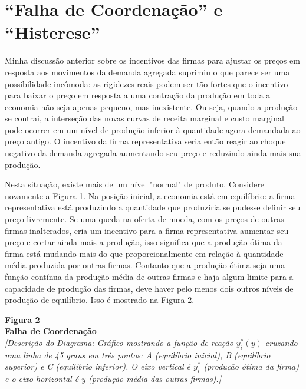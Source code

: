 \documentclass[12pt]{article}
\begin{document}
{\section*{“Falha de Coordenação” e “Histerese”}

Minha discussão anterior sobre os incentivos das firmas para ajustar os preços em resposta aos movimentos da demanda agregada suprimiu o que parece ser uma possibilidade incômoda: as rigidezes reais podem ser tão fortes que o incentivo para baixar o preço em resposta a uma contração da produção em toda a economia não seja apenas pequeno, mas inexistente. Ou seja, quando a produção se contrai, a interseção das novas curvas de receita marginal e custo marginal pode ocorrer em um nível de produção inferior à quantidade agora demandada ao preço antigo. O incentivo da firma representativa seria então reagir ao choque negativo da demanda agregada aumentando seu preço e reduzindo ainda mais sua produção.

Nesta situação, existe mais de um nível "normal" de produto. Considere novamente a Figura 1. Na posição inicial, a economia está em equilíbrio: a firma representativa está produzindo a quantidade que produziria se pudesse definir seu preço livremente. Se uma queda na oferta de moeda, com os preços de outras firmas inalterados, cria um incentivo para a firma representativa aumentar seu preço e cortar ainda mais a produção, isso significa que a produção ótima da firma está mudando mais do que proporcionalmente em relação à quantidade média produzida por outras firmas. Contanto que a produção ótima seja uma função contínua da produção média de outras firmas e haja algum limite para a capacidade de produção das firmas, deve haver pelo menos dois outros níveis de produção de equilíbrio. Isso é mostrado na Figura 2.

\begin{center}
\textbf{Figura 2} \\
\textbf{Falha de Coordenação} \\
\textit{[Descrição do Diagrama: Gráfico mostrando a função de reação $y^*_i(y)$ cruzando uma linha de 45 graus em três pontos: A (equilíbrio inicial), B (equilíbrio superior) e C (equilíbrio inferior). O eixo vertical é $y^*_i$ (produção ótima da firma) e o eixo horizontal é $y$ (produção média das outras firmas).]}
\end{center}

}
\end{document}
